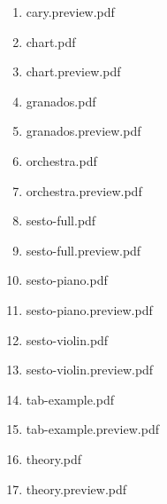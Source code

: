 \documentclass[11pt]{article}
\begin{document}
\begin{enumerate}
\begin{enumerate}
\begin{enumerate}
\begin{enumerate}
\begin{enumerate}
\begin{enumerate}
\begin{enumerate}
\begin{enumerate}
\begin{enumerate}
\begin{enumerate}
\item cary.preview.pdf
\label{sec-1-1-1-1-46-10-3-1-1-1-1-1-1-30-1-10}

\item chart.pdf
\label{sec-1-1-1-1-46-10-3-1-1-1-1-1-1-30-1-11}

\item chart.preview.pdf
\label{sec-1-1-1-1-46-10-3-1-1-1-1-1-1-30-1-12}

\item granados.pdf
\label{sec-1-1-1-1-46-10-3-1-1-1-1-1-1-30-1-13}

\item granados.preview.pdf
\label{sec-1-1-1-1-46-10-3-1-1-1-1-1-1-30-1-14}

\item orchestra.pdf
\label{sec-1-1-1-1-46-10-3-1-1-1-1-1-1-30-1-15}

\item orchestra.preview.pdf
\label{sec-1-1-1-1-46-10-3-1-1-1-1-1-1-30-1-16}

\item sesto-full.pdf
\label{sec-1-1-1-1-46-10-3-1-1-1-1-1-1-30-1-17}

\item sesto-full.preview.pdf
\label{sec-1-1-1-1-46-10-3-1-1-1-1-1-1-30-1-18}

\item sesto-piano.pdf
\label{sec-1-1-1-1-46-10-3-1-1-1-1-1-1-30-1-19}

\item sesto-piano.preview.pdf
\label{sec-1-1-1-1-46-10-3-1-1-1-1-1-1-30-1-20}

\item sesto-violin.pdf
\label{sec-1-1-1-1-46-10-3-1-1-1-1-1-1-30-1-21}

\item sesto-violin.preview.pdf
\label{sec-1-1-1-1-46-10-3-1-1-1-1-1-1-30-1-22}

\item tab-example.pdf
\label{sec-1-1-1-1-46-10-3-1-1-1-1-1-1-30-1-23}

\item tab-example.preview.pdf
\label{sec-1-1-1-1-46-10-3-1-1-1-1-1-1-30-1-24}

\item theory.pdf
\label{sec-1-1-1-1-46-10-3-1-1-1-1-1-1-30-1-25}

\item theory.preview.pdf
\label{sec-1-1-1-1-46-10-3-1-1-1-1-1-1-30-1-26}
\end{enumerate}
\end{enumerate}
\end{enumerate}


\end{enumerate}
\end{enumerate}
\end{enumerate}
\end{enumerate}
\end{enumerate}
\end{enumerate}
\end{enumerate}
\end{document}
